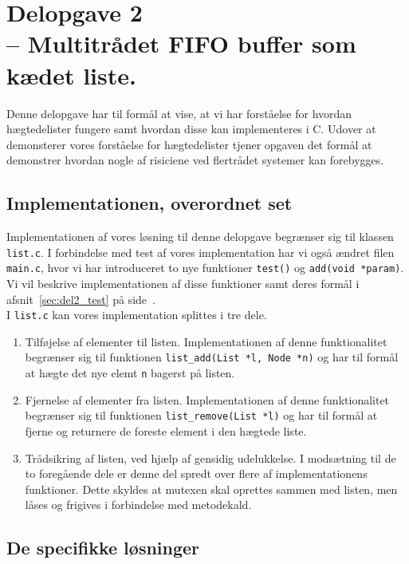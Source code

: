 \documentclass[main.tex]{subfile}
\begin{document}
\section{Delopgave 2\\\normalsize{-- Multitrådet FIFO buffer som kædet liste.}}\label{sec:opg2}
Denne delopgave har til formål at vise, at vi har forståelse for hvordan hægtedelister fungere samt hvordan disse kan implementeres i C. Udover at demonsterer vores forståelse for hægtedelister tjener opgaven det formål at demonstrer hvordan nogle af risiciene ved flertrådet systemer kan forebygges.

\subsection{Implementationen, overordnet set}
Implementationen af vores løsning til denne delopgave begrænser sig til klassen \texttt{list.c}. I forbindelse med test af vores implementation har vi også ændret filen \texttt{main.c}, hvor vi har introduceret to nye funktioner \texttt{test()} og \texttt{add(void *param)}. Vi vil beskrive implementationen af disse funktioner samt deres formål i afsnit~\ref{sec:del2_test} på side~\pageref{sec:del2_test}.\\

I \texttt{list.c} kan vores implementation splittes i tre dele.
\begin{enumerate}
\item Tilføjelse af elementer til listen. Implementationen af denne funktionalitet begrænser sig til funktionen \texttt{list\_add(List *l, Node *n)} og har til formål at hægte det nye elemt \texttt{n} bagerst på listen.
\item Fjernelse af elementer fra listen. Implementationen af denne funktionalitet begrænser sig til funktionen \texttt{list\_remove(List *l)} og har til formål at fjerne og returnere de foreste element i den hægtede liste.
\item Trådsikring af listen, ved hjælp af gensidig udelukkelse. I modsætning til de to foregående dele er denne del spredt over flere af implementationens funktioner. Dette skyldes at mutexen skal oprettes sammen med listen, men låses og frigives i forbindelse med metodekald.  
\end{enumerate}

\subsection{De specifikke løsninger}
\end{document}
